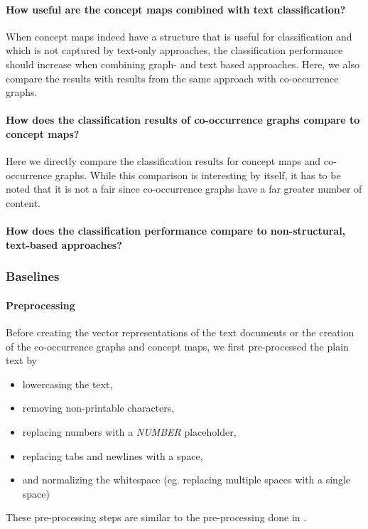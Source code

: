 \paragraph{How useful are the concept maps combined with text classification?}
When concept maps indeed have a structure that is useful for classification and which is not captured by text-only approaches, the classification performance should increase when combining graph- and text based approaches. Here, we also compare the results with results from the same approach with co-occurrence graphs.

\paragraph{How does the classification results of co-occurrence graphs compare to concept maps?}
Here we directly compare the classification results for concept maps and co-occurrence graphs. While this comparison is interesting by itself, it has to be noted that it is not a fair since co-occurrence graphs have a far greater number of content.

\paragraph{How does the classification performance compare to non-structural, text-based approaches?}
\todo{}


\subsubsection{Baselines}
\paragraph{Preprocessing}
Before creating the vector representations of the text documents or the creation of the co-occurrence graphs and concept maps, we first pre-processed the plain text by

\begin{itemize}
\item{lowercasing the text,}
\item{removing non-printable characters,}
\item{replacing numbers with a \textit{NUMBER} placeholder,}
\item{replacing tabs and newlines with a space,}
\item{and normalizing the whitespace (eg. replacing multiple spaces with a single space)}
\end{itemize}
These pre-processing steps are similar to the pre-processing done in \cite{Cachopo2007}.

